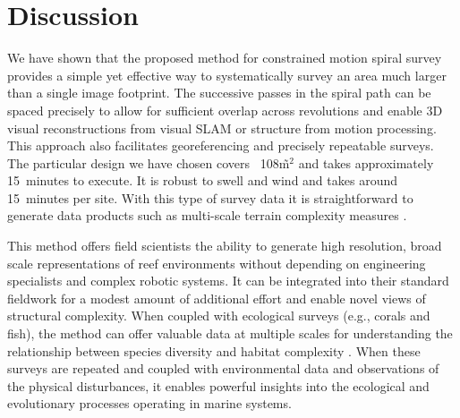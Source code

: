 \section{Discussion}
We have shown that the proposed method for constrained motion spiral survey provides a simple yet effective way to systematically survey an area much larger than a single image footprint. The successive passes in the spiral path can be spaced precisely to allow for sufficient overlap across revolutions and enable 3D visual reconstructions from visual SLAM or structure from motion processing. This approach also facilitates georeferencing and precisely repeatable surveys. The particular design we have chosen covers ~108\~m$^2$ and takes approximately 15~minutes to execute. It is robust to swell and wind and takes around 15~minutes per site. With this type of survey data it is straightforward to generate data products such as multi-scale terrain complexity measures \cite{Friedman_2012}.

This method offers field scientists the ability to generate high resolution, broad scale representations of reef environments without depending on engineering specialists and complex robotic systems. It can be integrated into their standard fieldwork for a modest amount of additional effort and enable novel views of structural complexity. When coupled with ecological surveys (e.g., corals and fish), the method can offer valuable data at multiple scales for understanding the relationship between species diversity and habitat complexity  \cite{Graham_2012}. When these surveys are repeated and coupled with environmental data and observations of the physical disturbances, it enables powerful insights into the ecological and evolutionary processes operating in marine systems.

